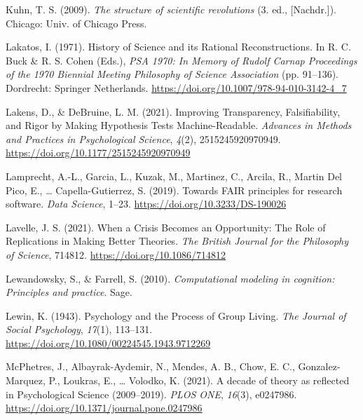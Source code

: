 \documentclass[
  man,floatsintext]{apa6}
\newlength{\cslhangindent}
\newenvironment{CSLReferences}[2] %
 {\begin{list}{}{%
  \setlength{\itemindent}{0pt}
  \setlength{\leftmargin}{0pt}
  \setlength{\parsep}{0pt}
  \ifodd #1
   \setlength{\leftmargin}{\cslhangindent}
   \setlength{\itemindent}{-1\cslhangindent}
  \fi
  \setlength{\itemsep}{#2\baselineskip}}}
 {\end{list}}
\begin{document}
\begin{CSLReferences}{1}{0}
Kuhn, T. S. (2009). \emph{The structure of scientific revolutions} (3. ed., {[}Nachdr.{]}). Chicago: Univ. of Chicago Press.

Lakatos, I. (1971). History of {Science} and its {Rational Reconstructions}. In R. C. Buck \& R. S. Cohen (Eds.), \emph{{PSA} 1970: {In Memory} of {Rudolf Carnap Proceedings} of the 1970 {Biennial Meeting Philosophy} of {Science Association}} (pp. 91--136). Dordrecht: Springer Netherlands. \url{https://doi.org/10.1007/978-94-010-3142-4_7}

Lakens, D., \& DeBruine, L. M. (2021). Improving {Transparency}, {Falsifiability}, and {Rigor} by {Making Hypothesis Tests Machine-Readable}. \emph{Advances in Methods and Practices in Psychological Science}, \emph{4}(2), 2515245920970949. \url{https://doi.org/10.1177/2515245920970949}

Lamprecht, A.-L., Garcia, L., Kuzak, M., Martinez, C., Arcila, R., Martin Del Pico, E., \ldots{} Capella-Gutierrez, S. (2019). Towards {FAIR} principles for research software. \emph{Data Science}, 1--23. \url{https://doi.org/10.3233/DS-190026}

Lavelle, J. S. (2021). When a {Crisis Becomes} an {Opportunity}: {The Role} of {Replications} in {Making Better Theories}. \emph{The British Journal for the Philosophy of Science}, 714812. \url{https://doi.org/10.1086/714812}

Lewandowsky, S., \& Farrell, S. (2010). \emph{Computational modeling in cognition: {Principles} and practice}. Sage.

Lewin, K. (1943). Psychology and the {Process} of {Group Living}. \emph{The Journal of Social Psychology}, \emph{17}(1), 113--131. \url{https://doi.org/10.1080/00224545.1943.9712269}

McPhetres, J., Albayrak-Aydemir, N., Mendes, A. B., Chow, E. C., Gonzalez-Marquez, P., Loukras, E., \ldots{} Volodko, K. (2021). A decade of theory as reflected in {Psychological Science} (2009--2019). \emph{PLOS ONE}, \emph{16}(3), e0247986. \url{https://doi.org/10.1371/journal.pone.0247986}


\end{CSLReferences}
\end{document}
